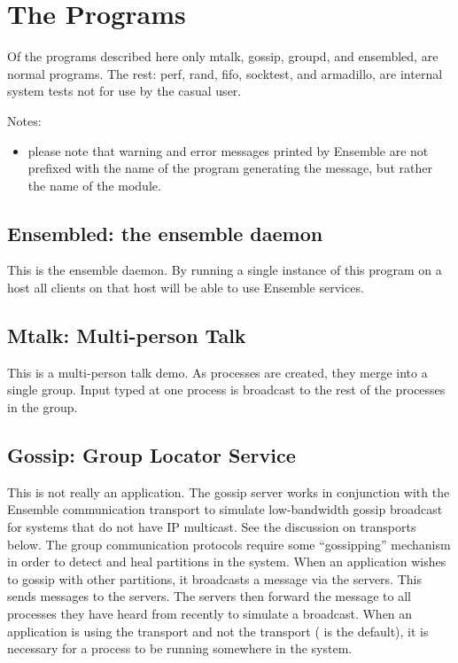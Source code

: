 \section{The Programs}
Of the programs described here only mtalk, gossip, groupd, and
ensembled, are normal programs. The rest: perf, rand, fifo, socktest,
and armadillo, are internal system tests not for use by the casual user. 

Notes:
\begin{itemize}
\item
please note that warning and error messages printed by Ensemble are
not prefixed with the name of the program generating the message, but
rather the name of the module.
\end{itemize}

\subsection{Ensembled: the ensemble daemon}
This is the ensemble daemon. By running a single instance of this
program on a host all clients on that host will be able to use Ensemble services. 

\subsection{Mtalk: Multi-person Talk}
This is a multi-person talk demo.  As  processes are created, they merge
into a single group.  Input typed at one process is broadcast to the rest of the
processes in the group.

\subsection{Gossip: Group Locator Service}
This is not really an application.  The gossip server works in
conjunction with the Ensemble  communication transport to
simulate low-bandwidth gossip broadcast for systems that do not have
IP multicast.  See the discussion on transports below.  The group
communication protocols require some ``gossipping'' mechanism in order
to detect and heal partitions in the system.  When an application
wishes to gossip with other partitions, it broadcasts a message via
the  servers.  This sends messages to the 
servers.  The  servers then forward the message to all
processes they have heard from recently to simulate a broadcast.  When
an application is using the  transport and not the
 transport ( is the default), it is
necessary for a  process to be running somewhere in the
system.

